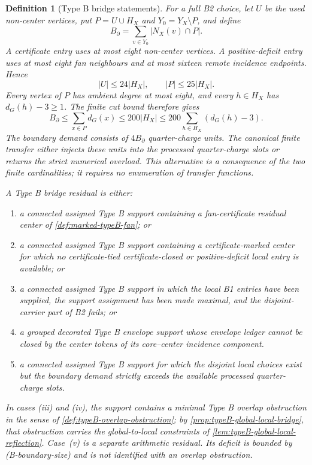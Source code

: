 \documentclass[11pt]{article}
\newtheorem{definition}[theorem]{Definition}
\begin{document}
\begin{definition}[Type B bridge statements]
For a full B2 choice, let \(U\) be the used non-center vertices, put
\(P=U\cup H_X\) and \(Y_0=Y_X\setminus P\), and define
\[
B_\partial=\sum_{v\in Y_0}|N_X(v)\cap P|.
\]
A certificate entry uses at most eight non-center vertices.  A
positive-deficit entry uses at most eight fan neighbours and at most sixteen
remote incidence endpoints.  Hence
\[
 |U|\le24|H_X|,\qquad |P|\le25|H_X|.
\tag{B-support-size}
\]
Every vertex of \(P\) has ambient degree at most eight, and every
\(h\in H_X\) has \(d_G(h)-3\ge1\).  The finite cut bound therefore gives
\[
B_\partial
 \le\sum_{x\in P}d_G(x)
 \le200|H_X|
 \le200\sum_{h\in H_X}(d_G(h)-3).
\tag{B-boundary-size}
\]
The boundary demand consists of \(4B_\partial\) quarter-charge units.  The
canonical finite transfer either injects these units into the processed
quarter-charge slots or returns the strict numerical overload.  This
alternative is a consequence of the two finite cardinalities; it requires no
enumeration of transfer functions.

A \emph{Type B bridge residual} is either:
\begin{enumerate}[label=(\roman*), leftmargin=2.2em]
\item a connected assigned Type B support containing a fan-certificate residual
center of \cref{def:marked-typeB-fan}; or
\item a connected assigned Type B support containing a certificate-marked
center for which no certificate-tied certificate-closed or positive-deficit
local entry is available; or
\item a connected assigned Type B support in which the local B1 entries have
been supplied, the support assignment has been made maximal, and the
disjoint-carrier part of B2 fails; or
\item a grouped decorated Type B envelope support whose envelope ledger cannot
be closed by the center tokens of its core--center incidence component.
\item a connected assigned Type B support for which the disjoint local choices
exist but the boundary demand strictly exceeds the available processed
quarter-charge slots.
\end{enumerate}
In cases (iii) and (iv), the support contains a minimal Type B overlap
obstruction in the sense of \cref{def:typeB-overlap-obstruction}; by
\cref{prop:typeB-global-local-bridge}, that obstruction carries the
global-to-local constraints of \cref{lem:typeB-global-local-reflection}.
Case~(v) is a separate arithmetic residual.  Its deficit is bounded by
\textup{(B-boundary-size)} and is not identified with an overlap obstruction.
\end{definition}
\end{document}
